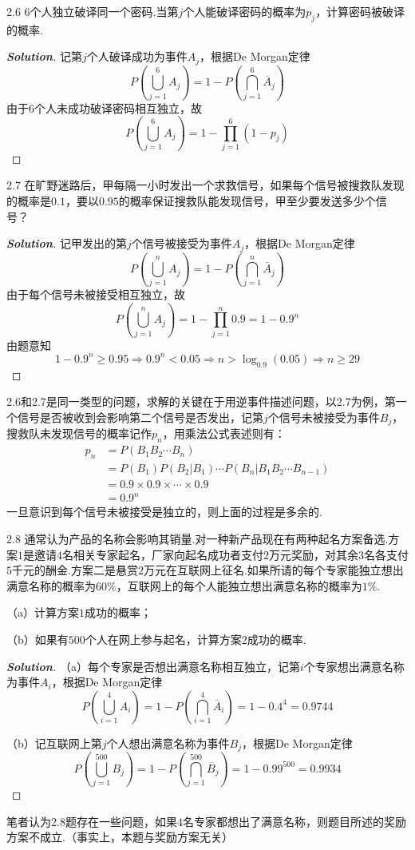 \documentclass[10pt, a4paper, oneside]{ctexart}
\newenvironment{solution}{\begin{proof}[\bf Solution]}{\end{proof}}
\begin{document}
2.6 $6$个人独立破译同一个密码.当第$j$个人能破译密码的概率为$p_j$，计算密码被破译的概率.
\begin{solution}
记第$j$个人破译成功为事件$A_j$，根据De Morgan定律
\[P(\bigcup\limits_{j = 1}^6 {{A_j}} ) = 1 - P(\bigcap\limits_{j = 1}^6 {{{\overline A }_j}} )\]
由于$6$个人未成功破译密码相互独立，故
\[P(\bigcup\limits_{j = 1}^6 {{A_j}} ) = 1 - \prod\limits_{j = 1}^6 {(1 - {p_j})} \]
\end{solution}

2.7 在旷野迷路后，甲每隔一小时发出一个求救信号，如果每个信号被搜救队发现的概率是$0.1$，要以$0.95$的概率保证搜救队能发现信号，甲至少要发送多少个信号？
\begin{solution}
记甲发出的第$j$个信号被接受为事件$A_j$，根据De Morgan定律
\[P(\bigcup\limits_{j = 1}^n {{A_j}} ) = 1 - P(\bigcap\limits_{j = 1}^n {{{\bar A}_j}} )\]
由于每个信号未被接受相互独立，故
\[P(\bigcup\limits_{j = 1}^n {{A_j}} ) = 1 - \prod\limits_{j = 1}^n {0.9}  = 1 - {0.9^n}\]
由题意知
\[1 - {0.9^n} \geqslant 0.95 \Rightarrow {0.9^n} < 0.05 \Rightarrow n > {\log _{0.9}}(0.05) \Rightarrow n \geqslant 29\]
\end{solution}
\begin{remark}
2.6和2.7是同一类型的问题，求解的关键在于用逆事件描述问题，以2.7为例，第一个信号是否被收到会影响第二个信号是否发出，记第$j$个信号未被接受为事件$B_j$，搜救队未发现信号的概率记作$p_n$，用乘法公式表述则有：
\[
\begin{aligned}
{p_n} &= P({B_1}{B_2} \cdots {B_n})\\
& = P({B_1})P({B_2}|{B_1}) \cdots P({B_n}|{B_1}{B_2} \cdots {B_{n - 1}})\\
& = 0.9\times0.9\times \cdots \times 0.9\\
& = 0.9^n
\end{aligned}
\]
一旦意识到每个信号未被接受是独立的，则上面的过程是多余的.
\end{remark}

2.8 通常认为产品的名称会影响其销量.对一种新产品现在有两种起名方案备选.方案$1$是邀请$4$名相关专家起名，厂家向起名成功者支付$2$万元奖励，对其余$3$名各支付$5$千元的酬金.方案二是悬赏$2$万元在互联网上征名.如果所请的每个专家能独立想出满意名称的概率为$60\%$，互联网上的每个人能独立想出满意名称的概率为$1\%$.

（a）计算方案$1$成功的概率；

（b）如果有$500$个人在网上参与起名，计算方案$2$成功的概率.
\begin{solution}
（a）每个专家是否想出满意名称相互独立，记第$i$个专家想出满意名称为事件$A_i$，根据De Morgan定律
\[P(\bigcup\limits_{i = 1}^4 {{A_i}} ) = 1 - P(\bigcap\limits_{i = 1}^4 {{{\overline A }_i}} ) = 1 - {0.4^4} = 0.9744\]

（b）记互联网上第$j$个人想出满意名称为事件$B_j$，根据De Morgan定律
\[P(\bigcup\limits_{j = 1}^{500} {{B_j}} ) = 1 - P(\bigcap\limits_{j = 1}^{500} {{{\overline B }_j}} ) = 1 - {0.99^{500}} = 0.9934\]
\end{solution}
\begin{remark}
笔者认为2.8题存在一些问题，如果$4$名专家都想出了满意名称，则题目所述的奖励方案不成立.（事实上，本题与奖励方案无关）
\end{remark}
\end{document}
